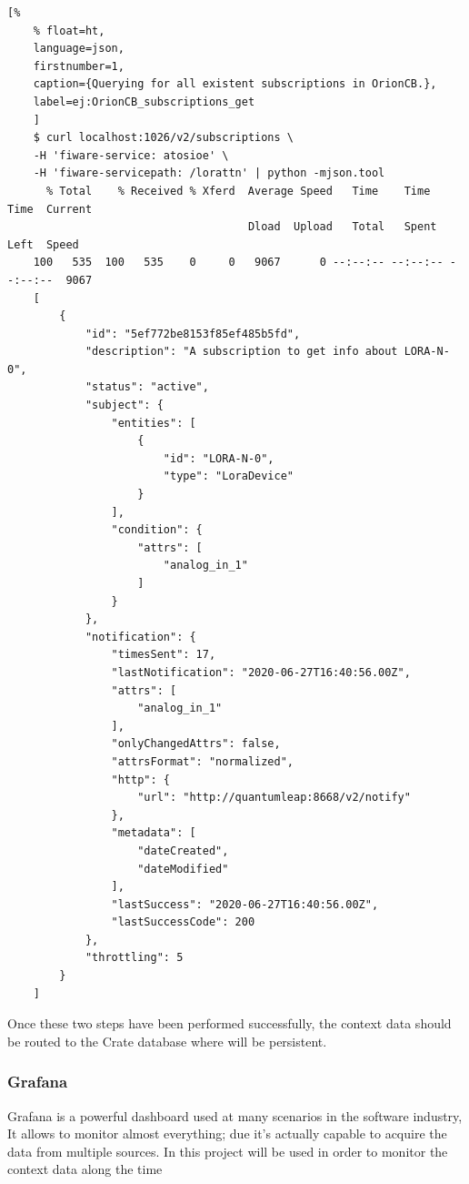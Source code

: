 \documentclass[11pt,a4paper,dvipsnames,twoside]{article}
\begin{document}
\begin{itemize}
  \begin{lstlisting}[%
    % float=ht,
    language=json,
    firstnumber=1,
    caption={Querying for all existent subscriptions in OrionCB.},
    label=ej:OrionCB_subscriptions_get
    ]
    $ curl localhost:1026/v2/subscriptions \
    -H 'fiware-service: atosioe' \
    -H 'fiware-servicepath: /lorattn' | python -mjson.tool
      % Total    % Received % Xferd  Average Speed   Time    Time     Time  Current
                                     Dload  Upload   Total   Spent    Left  Speed
    100   535  100   535    0     0   9067      0 --:--:-- --:--:-- --:--:--  9067
    [
        {
            "id": "5ef772be8153f85ef485b5fd",
            "description": "A subscription to get info about LORA-N-0",
            "status": "active",
            "subject": {
                "entities": [
                    {
                        "id": "LORA-N-0",
                        "type": "LoraDevice"
                    }
                ],
                "condition": {
                    "attrs": [
                        "analog_in_1"
                    ]
                }
            },
            "notification": {
                "timesSent": 17,
                "lastNotification": "2020-06-27T16:40:56.00Z",
                "attrs": [
                    "analog_in_1"
                ],
                "onlyChangedAttrs": false,
                "attrsFormat": "normalized",
                "http": {
                    "url": "http://quantumleap:8668/v2/notify"
                },
                "metadata": [
                    "dateCreated",
                    "dateModified"
                ],
                "lastSuccess": "2020-06-27T16:40:56.00Z",
                "lastSuccessCode": 200
            },
            "throttling": 5
        }
    ]

  \end{lstlisting}

\end{itemize}

Once these two steps have been performed successfully, the context data should be routed to the Crate database where will be persistent. 

\subsubsection{Grafana}
Grafana is a powerful dashboard used at many scenarios in the software industry, It allows to monitor almost everything; due it's actually capable to acquire the data from multiple sources. In this project will be used in order to monitor the context data along the time
\end{document}
